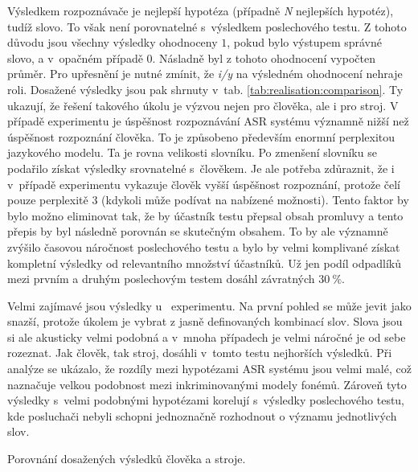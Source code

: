 Výsledkem rozpoznávače je nejlepší hypotéza (případně \textit{N} nejlepších hypotéz), tudíž slovo.
To však není porovnatelné s~výsledkem poslechového testu.
Z tohoto důvodu jsou všechny výsledky ohodnoceny $1$, pokud bylo výstupem správné slovo, a v~opačném případě $0$.
Násladně byl z tohoto ohodnocení vypočten průměr.
Pro upřesnění je nutné zmínit, že \textit{i/y} na výsledném ohodnocení nehraje roli.
Dosažené výsledky jsou pak shrnuty v~tab. \ref{tab:realisation:comparison}.
Ty ukazují, že řešení takového úkolu je výzvou nejen pro člověka, ale i pro stroj.
V případě experimentu  je úspěšnost rozpoznávání ASR systému významně nižší než úspěšnost rozpoznání člověka.
To je způsobeno především enormní perplexitou jazykového modelu.
Ta je rovna velikosti slovníku.
Po zmenšení slovníku se podařilo získat výsledky srovnatelné s~člověkem.
Je ale potřeba zdůraznit, že i v~případě  experimentu vykazuje člověk vyšší úspěšnost rozpoznání, protože čelí pouze perplexitě $3$ (kdykoli může podívat na nabízené možnosti).
Tento faktor by bylo možno eliminovat tak, že by účastník testu přepsal obsah promluvy a tento přepis by byl následně porovnán se skutečným obsahem.
To by ale významně zvýšilo časovou náročnost poslechového testu a bylo by velmi komplivané získat kompletní výsledky od relevantního množství účastníků.
Už jen podíl odpadlíků mezi prvním a druhým poslechovým testem dosáhl závratných $30~\%$.

Velmi zajímavé jsou výsledky u~ experimentu.
Na první pohled se může jevit jako snazší, protože úkolem je vybrat z jasně definovaných kombinací slov.
Slova jsou si ale akusticky velmi podobná a v~mnoha případech je velmi náročné je od sebe rozeznat.
Jak člověk, tak stroj, dosáhli v~tomto testu nejhorších výsledků.
Při analýze se ukázalo, že rozdíly mezi hypotézami ASR systému jsou velmi malé, což naznačuje velkou podobnost mezi inkriminovanými modely fonémů.
Zároveň tyto výsledky s~velmi podobnými hypotézami korelují s~výsledky poslechového testu, kde posluchači nebyli schopni jednoznačně rozhodnout o významu jednotlivých slov.

\begin{table}[htpb]
  \centering
  \def\arraystretch{1.5}
  \caption{Porovnání dosažených výsledků člověka a stroje.}
  \label{tab:realisation:comparison}
\end{table}

